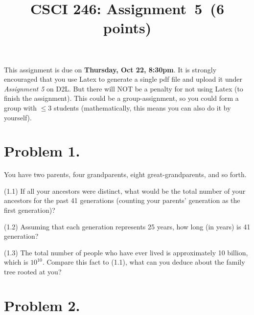 \documentclass[11pt]{article}
\begin{document}
\date{}

\title{CSCI 246: Assignment~5~(6 points)}


\maketitle


\noindent
This assignment is due on {\bf Thursday, Oct 22, 8:30pm}. It is strongly
encouraged that you use Latex to generate a single pdf file and upload it
under {\em Assignment 5} on D2L. But there will NOT be a penalty for not
using Latex (to finish the assignment). This could be a group-assignment,
so you could form a group with $\leq 3$ students (mathematically, this means
you can also do it by yourself).
\newline
 
\section*{Problem 1.}

\noindent
You have two parents, four grandparents, eight great-grandparents, and so forth.
\newline

\noindent
(1.1) If all your ancestors were distinct, what would be the total number of your ancestors for the past 41 generations (counting your parents' generation as the first generation)?
\newline
\newline
\newline

\noindent
(1.2) Assuming that each generation represents 25 years, how long (in years) is 41 generation?
\newline
\newline
\newline

\noindent
(1.3) The total number of people who have ever lived is approximately 10
billion, which is $10^{10}$. Compare this fact to (1.1), what can you deduce
about the family tree rooted at you?
\newline
\newline
\newline


\section*{Problem 2.}
\end{document}
